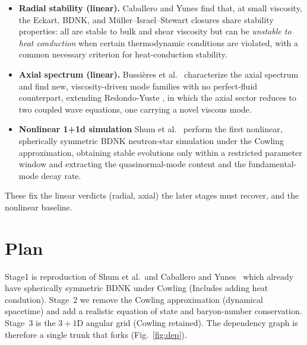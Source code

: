 \documentclass[11pt]{article}
\begin{document}
\begin{itemize}
\item \textbf{Radial stability (linear).} Caballero and Yunes
\cite{CaballeroYunes2025} find that, at small viscosity, the Eckart, BDNK, and
M\"uller--Israel--Stewart closures share stability properties: all are stable to
bulk and shear viscosity but can be \emph{unstable to heat conduction} when
certain thermodynamic conditions are violated, with a common necessary criterion
for heat-conduction stability.

\item \textbf{Axial spectrum (linear).} Bussi\`eres et al.\ \cite{Bussieres2026}
characterize the axial spectrum and find new, viscosity-driven mode families with
no perfect-fluid counterpart, extending Redondo-Yuste \cite{RedondoYuste2025}, in
which the axial sector reduces to two coupled wave equations, one carrying a novel
viscous mode.

\item \textbf{Nonlinear 1+1d simulation} Shum et al.\ \cite{Shum2026} perform the first
nonlinear, spherically symmetric BDNK neutron-star simulation under the Cowling
approximation, obtaining stable evolutions only within a restricted parameter
window and extracting the quasinormal-mode content and the fundamental-mode decay
rate.
\end{itemize}

\noindent These fix the linear verdicts (radial, axial) the later stages must
recover, and the nonlinear baseline.

\section{Plan}
Stage1 is reproduction of Shum et al.\ and Caballero and Yunes \ which already have spherically symmetric BDNK under Cowling (Includes adding heat condution). Stage~2 we remove the Cowling
approximation (dynamical spacetime) and add a realistic equation of state
and baryon-number conservation. Stage~3 is the 
$3{+}1$D angular grid (Cowling retained). The dependency graph is therefore a
single trunk that forks (Fig.~\ref{fig:dep}).
\end{document}
